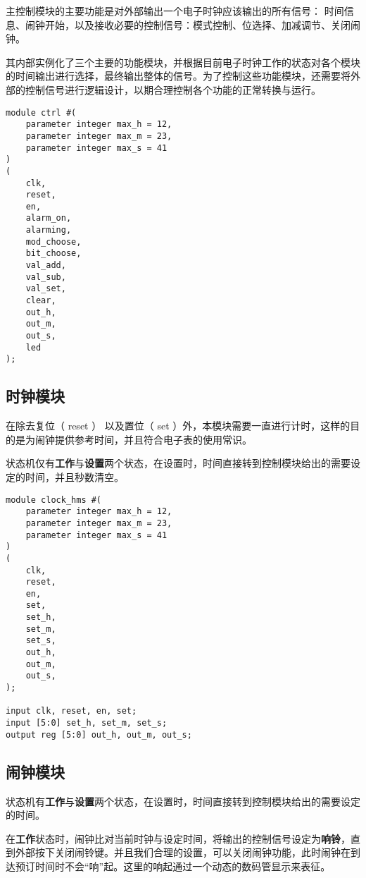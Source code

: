 \documentclass[lang=cn,11pt,a4paper,cite=authoryear]{elegantpaper}
\begin{document}
主控制模块的主要功能是对外部输出一个电子时钟应该输出的所有信号： 时间信息、闹钟开始，以及接收必要的控制信号：模式控制、位选择、加减调节、关闭闹钟。

其内部实例化了三个主要的功能模块，并根据目前电子时钟工作的状态对各个模块的时间输出进行选择，最终输出整体的信号。为了控制这些功能模块，还需要将外部的控制信号进行逻辑设计，以期合理控制各个功能的正常转换与运行。

\begin{lstlisting}[caption={主控制模块端口定义}]
module ctrl #(
    parameter integer max_h = 12,
    parameter integer max_m = 23,
    parameter integer max_s = 41
) 
(
    clk,
    reset,
    en,
    alarm_on,
    alarming,
    mod_choose,
    bit_choose,
    val_add,
    val_sub,
    val_set,
    clear,
    out_h,
    out_m,
    out_s,
    led
);
\end{lstlisting}

\subsection{时钟模块}

在除去复位（ reset ） 以及置位（ set ）外，本模块需要一直进行计时，这样的目的是为闹钟提供参考时间，并且符合电子表的使用常识。

状态机仅有\textbf{工作}与\textbf{设置}两个状态，在设置时，时间直接转到控制模块给出的需要设定的时间，并且秒数清空。

\begin{lstlisting}[caption={时钟模块端口定义}]
module clock_hms #(
    parameter integer max_h = 12,
    parameter integer max_m = 23,
    parameter integer max_s = 41
) 
(
    clk,
    reset,
    en,
    set,
    set_h,
    set_m,
    set_s,
    out_h,
    out_m,
    out_s,
);

input clk, reset, en, set;
input [5:0] set_h, set_m, set_s;
output reg [5:0] out_h, out_m, out_s;
\end{lstlisting}
    
    
\subsection{闹钟模块}

状态机有\textbf{工作}与\textbf{设置}两个状态，在设置时，时间直接转到控制模块给出的需要设定的时间。

在\textbf{工作}状态时，闹钟比对当前时钟与设定时间，将输出的控制信号设定为\textbf{响铃}，直到外部按下关闭闹铃键。并且我们合理的设置，可以关闭闹钟功能，此时闹钟在到达预订时间时不会“响”起。这里的响起通过一个动态的数码管显示来表征。
\end{document}
